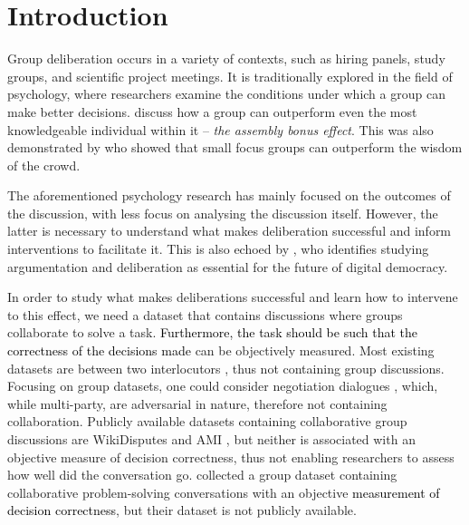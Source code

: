 \documentclass[acmsmall,manuscript,screen]{acmart}
\newcommand\newtext[1]{\textcolor{black}{#1}}
\begin{document}


\maketitle

\section{Introduction}



Group deliberation occurs in a variety of contexts, such as hiring panels, study groups, and scientific project meetings. It is traditionally explored in the field of psychology, where researchers examine the conditions under which a group can make better decisions. \citet{mercier2011humans} discuss how a group can outperform even the most knowledgeable individual within it -- \textit{the assembly bonus effect}.
This was also demonstrated by \citet{navajas2018aggregated} who showed that small focus groups can outperform the wisdom of the crowd.  

The aforementioned psychology research has mainly focused on the outcomes of the discussion, with less focus on analysing the discussion itself. 
However, the latter is necessary to understand what makes deliberation successful and inform interventions to facilitate it.
This is also echoed by \citet{vecchi-etal-2021-towards}, who identifies studying argumentation and deliberation as essential for the future of digital democracy.




In order to study what makes deliberations successful and learn how to intervene to this effect, we need a dataset that contains discussions where groups collaborate to solve a task. \newtext{Furthermore, the task should be such that the correctness of the decisions made}
can be objectively measured. Most existing datasets are between two interlocutors \citep{budzianowski2018multiwoz, dinan2019wizard, andersonmaptask}, thus not containing group discussions. Focusing on group datasets, one could consider negotiation dialogues \cite{afantenos2012modelling}, which, while multi-party, are adversarial in nature, therefore not containing collaboration. Publicly available datasets containing collaborative group discussions are WikiDisputes \citep{de2021beg} and AMI \cite{carletta2005ami}, but neither is associated with an objective measure of decision correctness, thus not enabling researchers to assess
how well did the conversation go.
\citet{niculae2016conversational} collected a group dataset containing collaborative problem-solving conversations with an objective \newtext{measurement of decision correctness}, but their dataset is not publicly available. 
\end{document}

